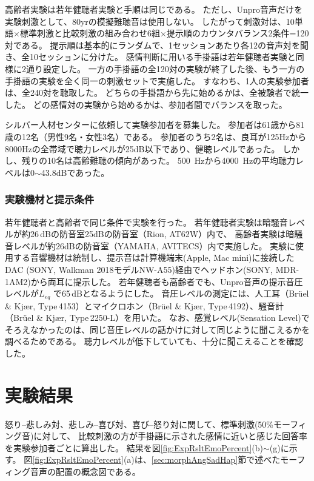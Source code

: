 高齢者実験は若年健聴者実験と手順は同じである。
ただし、Unpro音声だけを実験刺激として、80yrの模擬難聴音は使用しない。
したがって刺激対は、10単語$\times$標準刺激と比較刺激の組み合わせ6組$\times$提示順のカウンタバランス2条件=120対である。
提示順は基本的にランダムで、1セッションあたり各12の音声対を聞き、全10セッションに分けた。
感情判断に用いる手掛語は若年健聴者実験と同様に2通り設定した。
一方の手掛語の全120対の実験が終了した後、もう一方の手掛語の実験を全く同一の刺激セットで実施した。
すなわち、1人の実験参加者は、全240対を聴取した。
どちらの手掛語から先に始めるかは、全被験者で統一した。
どの感情対の実験から始めるかは、参加者間でバランスを取った。

シルバー人材センターに依頼して実験参加者を募集した。
参加者は61歳から81歳の12名（男性9名・女性3名）である。
参加者のうち2名は、良耳が125Hzから8000Hzの全帯域で聴力レベルが25dB以下であり、健聴レベルであった。
しかし、残りの10名は高齢難聴の傾向があった。
500~Hzから4000~Hzの平均聴力レベルは0$\sim$43.8dBであった。


\subsubsection{実験機材と提示条件}
若年健聴者と高齢者で同じ条件で実験を行った。
若年健聴者実験は暗騒音レベルが約26\,dBの防音室25dBの防音室（Rion, AT62W）内で、
高齢者実験は暗騒音レベルが約26dBの防音室（YAMAHA, AVITECS）内で実施した。
実験に使用する音響機材は統制し、提示音は計算機端末(Apple, Mac mini)に接続したDAC (SONY, Walkman 2018モデルNW-A55)経由でヘッドホン(SONY, MDR-1AM2)から両耳に提示した。
若年健聴者も高齢者でも、Unpro音声の提示音圧レベルが${L_{eq}}$ で65\,dBとなるようにした。
音圧レベルの測定には、人工耳（Br\"{u}el \& Kj\ae r, Type\,4153）とマイクロホン（Br\"{u}el \& Kj\ae r, Type\,4192）、騒音計（Br\"{u}el \& Kj\ae r, Type\,2250-L）を用いた。
なお、感覚レベル(Sensation Level)でそろえなかったのは、同じ音圧レベルの話かけに対して同じように聞こえるかを調べるためである。
聴力レベルが低下していても、十分に聞こえることを確認した。


\newpage
\section{実験結果}
\label{sec:ResultAngSadHap}
怒り--悲しみ対、悲しみ--喜び対、喜び--怒り対に関して、標準刺激(50\%モーフィング音)に対して、
比較刺激の方が手掛語に示された感情に近いと感じた回答率を実験参加者ごとに算出した。
結果を図\ref{fig:ExpRsltEmoPercent}(b)$\sim$(g)に示す。
図\ref{fig:ExpRsltEmoPercent}(a)は、\ref{sec:morphAngSadHap}節で述べたモーフィング音声の配置の概念図である。



